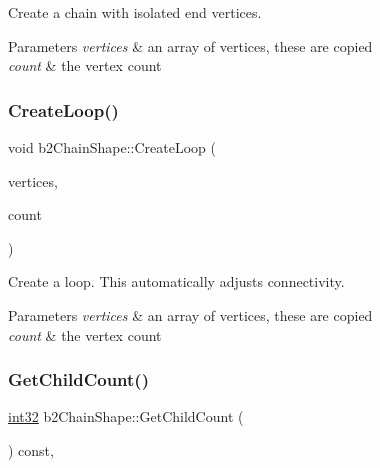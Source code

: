 Create a chain with isolated end vertices. 
\begin{DoxyParams}{Parameters}
{\em vertices} & an array of vertices, these are copied \\
\hline
{\em count} & the vertex count \\
\hline
\end{DoxyParams}
\mbox{\label{classb2_chain_shape_ac257742a52cac391e25962a4c703fb06}} 
\subsubsection{\texorpdfstring{CreateLoop()}{CreateLoop()}}
{\footnotesize\ttfamily void b2\+Chain\+Shape\+::\+Create\+Loop (\begin{DoxyParamCaption}\item[{const \mbox{\hyperlink{structb2_vec2}{b2\+Vec2}} $\ast$}]{vertices,  }\item[{\mbox{\hyperlink{b2_settings_8h_a43d43196463bde49cb067f5c20ab8481}{int32}}}]{count }\end{DoxyParamCaption})}

Create a loop. This automatically adjusts connectivity. 
\begin{DoxyParams}{Parameters}
{\em vertices} & an array of vertices, these are copied \\
\hline
{\em count} & the vertex count \\
\hline
\end{DoxyParams}
\mbox{\label{classb2_chain_shape_a4d4fd8f5386a30f35b10d1b2848dbe54}} 
\subsubsection{\texorpdfstring{GetChildCount()}{GetChildCount()}}
{\footnotesize\ttfamily \mbox{\hyperlink{b2_settings_8h_a43d43196463bde49cb067f5c20ab8481}{int32}} b2\+Chain\+Shape\+::\+Get\+Child\+Count (\begin{DoxyParamCaption}{ }\end{DoxyParamCaption}) const\hspace{0.3cm}{\ttfamily [override]}, {\ttfamily [virtual]}}


